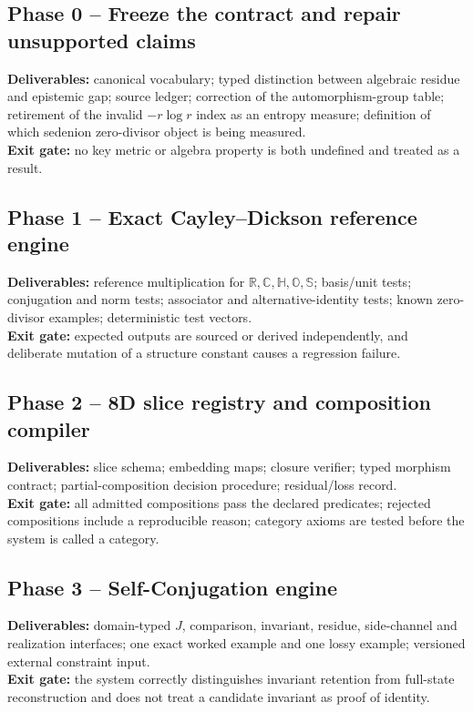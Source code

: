 \documentclass[11pt,oneside]{article}
\begin{document}
\subsection{Phase 0 -- Freeze the contract and repair unsupported claims}
\textbf{Deliverables:} canonical vocabulary; typed distinction between algebraic residue and epistemic gap; source ledger; correction of the automorphism-group table; retirement of the invalid $-r\log r$ index as an entropy measure; definition of which sedenion zero-divisor object is being measured.\\
\textbf{Exit gate:} no key metric or algebra property is both undefined and treated as a result.

\subsection{Phase 1 -- Exact Cayley--Dickson reference engine}
\textbf{Deliverables:} reference multiplication for $\mathbb R,\mathbb C,\mathbb H,\mathbb O,\mathbb S$; basis/unit tests; conjugation and norm tests; associator and alternative-identity tests; known zero-divisor examples; deterministic test vectors.\\
\textbf{Exit gate:} expected outputs are sourced or derived independently, and deliberate mutation of a structure constant causes a regression failure.

\subsection{Phase 2 -- 8D slice registry and composition compiler}
\textbf{Deliverables:} slice schema; embedding maps; closure verifier; typed morphism contract; partial-composition decision procedure; residual/loss record.\\
\textbf{Exit gate:} all admitted compositions pass the declared predicates; rejected compositions include a reproducible reason; category axioms are tested before the system is called a category.

\subsection{Phase 3 -- Self-Conjugation engine}
\textbf{Deliverables:} domain-typed $J$, comparison, invariant, residue, side-channel and realization interfaces; one exact worked example and one lossy example; versioned external constraint input.\\
\textbf{Exit gate:} the system correctly distinguishes invariant retention from full-state reconstruction and does not treat a candidate invariant as proof of identity.
\end{document}
